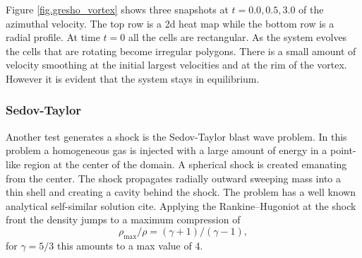 Figure \ref{fig.gresho_vortex} shows three snapshots at $t=0.0, 0.5, 3.0$ of the azimuthal
velocity. The top row is a 2d heat map while the bottom row is a radial profile. At time $t=0$
all the cells are rectangular. As the system evolves the cells that are rotating become irregular 
polygons. There is a small amount of velocity smoothing at the initial largest velocities and at
the rim of the vortex. However it is evident that the system stays in equilibrium.

\subsubsection{Sedov-Taylor}
Another test generates a shock is the Sedov-Taylor blast wave problem. In this problem a homogeneous
gas is injected with a large amount of energy in a point-like region at the center of the domain.
A spherical shock is created emanating from the center. The shock propagates radially outward
sweeping mass into a thin shell and creating a cavity behind the shock. The problem has a well known
analytical self-similar solution cite. Applying the Rankine–Hugoniot at the shock front the density
jumps to a maximum compression of
\begin{equation}
	\rho_{\mathrm{max}}/\rho = (\gamma + 1)/(\gamma - 1),
\end{equation}
for $\gamma = 5/3$ this amounts to a max value of 4.


